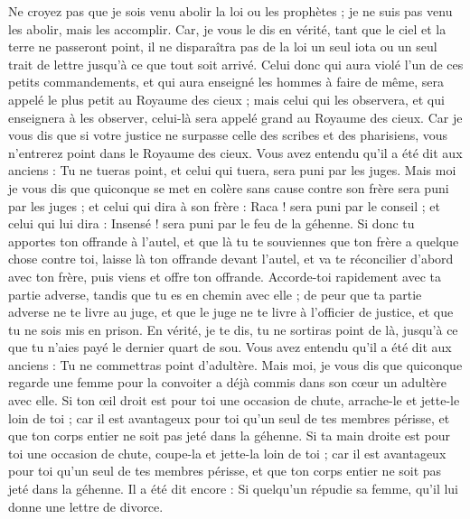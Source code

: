 \begin{multicols}{2}
Ne croyez pas que je sois venu abolir la loi ou les prophètes ; je ne suis pas venu les abolir, mais les accomplir.
Car, je vous le dis en vérité, tant que le ciel et la terre ne passeront point, il ne disparaîtra pas de la loi un seul iota ou un seul trait de lettre jusqu’à ce que tout soit arrivé.
Celui donc qui aura violé l'un de ces petits commandements, et qui aura enseigné les hommes à faire de même, sera appelé le plus petit au Royaume des cieux ; mais celui qui les observera, et qui enseignera à les observer, celui-là sera appelé grand au Royaume des cieux.
Car je vous dis que si votre justice ne surpasse celle des scribes et des pharisiens, vous n'entrerez point dans le Royaume des cieux.
Vous avez entendu qu'il a été dit aux anciens : Tu ne tueras point, et celui qui tuera, sera puni par les juges.
Mais moi je vous dis que quiconque se met en colère sans cause contre son frère sera puni par les juges ; et celui qui dira à son frère : Raca ! sera puni par le conseil ; et celui qui lui dira : Insensé ! sera puni par le feu de la géhenne{}.
Si donc tu apportes ton offrande à l'autel, et que là tu te souviennes que ton frère a quelque chose contre toi,
laisse là ton offrande devant l'autel, et va te réconcilier d’abord avec ton frère, puis viens et offre ton offrande.
Accorde-toi rapidement avec ta partie adverse, tandis que tu es en chemin avec elle ; de peur que ta partie adverse ne te livre au juge, et que le juge ne te livre à l’officier de justice, et que tu ne sois mis en prison.
En vérité, je te dis, tu ne sortiras point de là, jusqu'à ce que tu n’aies payé le dernier quart de sou.
Vous avez entendu qu'il a été dit aux anciens : Tu ne commettras point d’adultère.
Mais moi, je vous dis que quiconque regarde une femme pour la convoiter a déjà commis dans son cœur un adultère avec elle.
Si ton œil droit est pour toi une occasion de chute, arrache-le et jette-le loin de toi ; car il est avantageux pour toi qu'un seul de tes membres périsse, et que ton corps entier ne soit pas jeté dans la géhenne.
Si ta main droite est pour toi une occasion de chute, coupe-la et jette-la loin de toi ; car il est avantageux pour toi qu’un seul de tes membres périsse, et que ton corps entier ne soit pas jeté dans la géhenne.
Il a été dit encore : Si quelqu'un répudie sa femme, qu'il lui donne une lettre de divorce.

\end{multicols}
